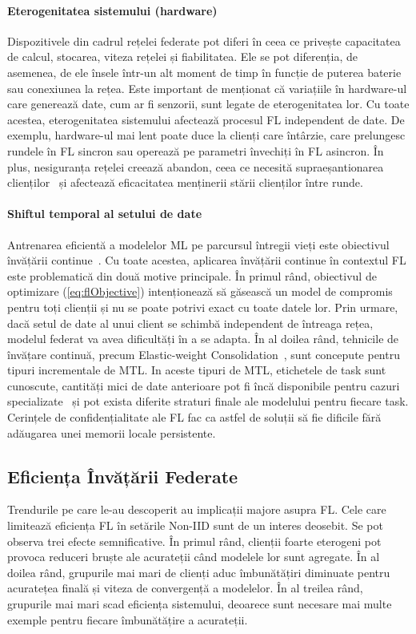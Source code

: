 \paragraph{Eterogenitatea sistemului (hardware)} Dispozitivele din cadrul rețelei federate pot diferi în ceea ce privește capacitatea de calcul, stocarea, viteza rețelei și fiabilitatea. Ele se pot diferenția, de asemenea, de ele însele într-un alt moment de timp în funcție de puterea baterie sau conexiunea la rețea. Este important de menționat că variațiile în hardware-ul care generează date, cum ar fi senzorii, sunt legate de eterogenitatea lor. Cu toate acestea, eterogenitatea sistemului afectează procesul FL independent de date. De exemplu, hardware-ul mai lent poate duce la clienți care întârzie, care prelungesc rundele în FL sincron sau operează pe parametri învechiți în FL asincron. În plus, nesiguranța rețelei creează abandon, ceea ce necesită supraeșantionarea clienților~\cite{ScaleSystemDesign} și afectează eficacitatea menținerii stării clienților între runde.

\paragraph{Shiftul temporal al setului de date} Antrenarea eficientă a modelelor ML pe parcursul întregii vieți este obiectivul învățării continue~\citep{ContinualLearningSurvey}. Cu toate acestea, aplicarea învățării continue în contextul FL este problematică din două motive principale. În primul rând, obiectivul de optimizare (\cref{eq:flObjective}) intenționează să găsească un model de compromis pentru toți clienții și nu se poate potrivi exact cu toate datele lor. Prin urmare, dacă setul de date al unui client se schimbă independent de întreaga rețea, modelul federat va avea dificultăți în a se adapta. În al doilea rând, tehnicile de învățare continuă, precum Elastic-weight Consolidation~\citep{kirkpatrick2017overcoming}, sunt concepute pentru tipuri incrementale de MTL. In aceste tipuri de MTL, etichetele de task sunt cunoscute, cantități mici de date anterioare pot fi încă disponibile pentru cazuri specializate~\citep{kirkpatrick2017overcoming} și pot exista diferite straturi finale ale modelului pentru fiecare task. Cerințele de confidențialitate ale FL fac ca astfel de soluții să fie dificile fără adăugarea unei memorii locale persistente.

\subsection{Eficiența Învățării Federate}
Trendurile pe care \citet{LargeCohorts} le-au descoperit au implicații majore asupra FL. Cele care limitează eficiența FL în setările Non-IID sunt de un interes deosebit. Se pot observa trei efecte semnificative. În primul rând, clienții foarte eterogeni pot provoca reduceri bruște ale acurateții când modelele lor sunt agregate. În al doilea rând, grupurile mai mari de clienți aduc îmbunătățiri diminuate pentru acuratețea finală și viteza de convergență a modelelor. În al treilea rând, grupurile mai mari scad eficiența sistemului, deoarece sunt necesare mai multe exemple pentru fiecare îmbunătățire a acurateții.


